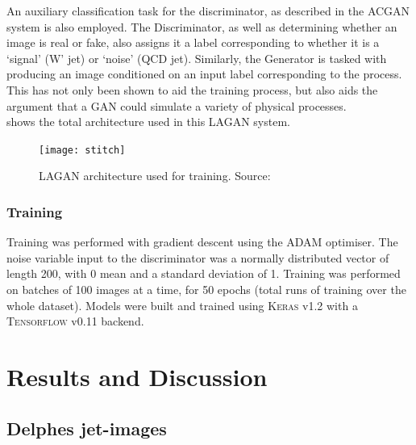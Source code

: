 \documentclass{report}
\newcommand{\pkg}[1]{\textsc{#1}}
\begin{document}
An auxiliary classification task for the discriminator, as described in the ACGAN system \cite{odena2016conditional} is also employed. The Discriminator, as well as determining whether an image is real or fake, also assigns it a label corresponding to whether it is a `signal' (W' jet) or `noise' (QCD jet). Similarly, the Generator is tasked with producing an image conditioned on an input label corresponding to the process. This has not only been shown to aid the training process, but also aids the argument that a GAN could simulate a variety of physical processes.\\

 shows the total architecture used in this LAGAN system. 
\begin{figure}[H]
	\centering
	\texttt{[image: stitch]}
	
	\caption{LAGAN architecture used for training. Source: \cite{de2017learning}}
	\label{fig:stitch}
	
\end{figure}   

\subsection{Training}
Training was performed with gradient descent using the ADAM \cite{adam} optimiser. The noise variable input to the discriminator was a normally distributed vector of length 200, with 0 mean and a standard deviation of 1. Training was performed on batches of 100 images at a time, for 50 epochs (total runs of training over the whole dataset). Models were built and trained using \pkg{Keras} v1.2 \cite{keras} with a \pkg{Tensorflow} v0.11 \cite{tensorflow} backend. 

\chapter{Results and Discussion}
\label{sec:results}
\section{Delphes jet-images}
\end{document}
